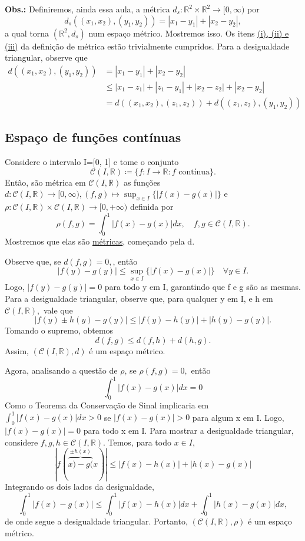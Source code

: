 \documentclass[MetricSpaces/metric_notes.tex]{subfiles}
\begin{document}
\textbf{Obs.:} Definiremos, ainda essa aula, a métrica \(d_{s}:\mathbb{R}^{2}\times \mathbb{R}^{2}\rightarrow [0, \infty)\) por
\[
	d_{s}((x_{1}, x_{2}), (y_{1}, y_{2})) = |x_{1}-y_{1}|+|x_{2}-y_{2}|,
\]
a qual torna \((\mathbb{R}^{2}, d_{s})\) num espaço métrico. Mostremos isso. Os itens \hyperlink{def_metric}{(i), (ii) e (iii)}
da definição de métrica estão trivialmente cumpridos. Para a desigualdade triangular, observe que
\begin{align*}
	d((x_{1}, x_{2}), (y_{1}, y_{2})) & = |x_{1}-y_{1}| + |x_{2}-y_{2}|                                        \\
	                                  & \leq |x_{1}-z_{1}| + |z_{1}-y_{1}| + |x_{2}-z_{2}| + |x_{2}-y_{2}|     \\
	                                  & =d((x_{1}, x_{2}), (z_{1}, z_{2})) + d((z_{1}, z_{2}), (y_{1}, y_{2}))
\end{align*}
\subsection{Espaço de funções contínuas}
Considere o intervalo I=[0, 1] e tome o conjunto
\[
	\mathcal{C}(I, \mathbb{R})\coloneqq \{f:I\rightarrow \mathbb{R}: f \text{ contínua}\}.
\]
Então, são métrica em \(\mathcal{C}(I, \mathbb{R})\) as funções \(d:\mathcal{C}(I, \mathbb{R})\rightarrow [0, \infty), (f, g)\mapsto \sup_{x\in I}\{|f(x)-g(x)|\}\)
e \(\rho :\mathcal{C}(I, \mathbb{R})\times \mathcal{C}(I, \mathbb{R})\rightarrow [0, +\infty)\) definida por
\[
	\rho(f, g) = \int_{0}^{1}|f(x)-g(x)|dx,\quad f, g\in \mathcal{C}(I, \mathbb{R}).
\]
Mostremos que elas são \hyperlink{def_metric}{métricas}, começando pela d.

Observe que, se \(d(f, g) = 0,\), então
\[
	|f(y)-g(y)|\leq \sup_{x\in I}\{|f(x)-g(x)|\}\quad \forall y\in I.
\]
Logo, \(|f(y) - g(y)| = 0\) para todo y em I, garantindo que f e g são as mesmas.
Para a desigualdade triangular, observe que, para qualquer y em I, e h em \(\mathcal{C}(I, \mathbb{R}),\) vale que
\[
	|f(y)\pm h(y) - g(y)|\leq |f(y) - h(y)| + |h(y) - g(y)|.
\]
Tomando o supremo, obtemos
\[
	d(f, g)\leq d(f, h) + d(h, g).
\]
Assim, \((\mathcal{C}(I, \mathbb{R}), d)\) é um espaço métrico.

Agora, analisando a questão de \(\rho\), se \(\rho (f, g) = 0,\) então
\[
	\int_{0}^{1}|f(x)-g(x)|dx = 0
\]
Como o Teorema da Conservação de Sinal implicaria em \(\int_{0}^{1}|f(x)-g(x)|dx > 0\) se \(|f(x)-g(x)| > 0\) para algum x em I.
Logo, \(|f(x)-g(x)|=0\) para todo x em I. Para mostrar a desigualdade triangular, considere \(f, g, h\in \mathcal{C}(I, \mathbb{R}).\)
Temos, para todo \(x\in I\),
\[
	|f(\overbrace{x)-g(}^{\pm h(x)}x)|\leq |f(x) - h(x)| + |h(x) - g(x)|
\]
Integrando os dois lados da desigualdade,
\[
	\int_{0}^{1}|f(x)-g(x)|\leq \int_{0}^{1}|f(x) - h(x)|dx + \int_{0}^{1}|h(x) - g(x)|dx,
\]
de onde segue a desigualdade triangular. Portanto, \((\mathcal{C}(I, \mathbb{R}), \rho)\) é um espaço métrico.
\end{document}
